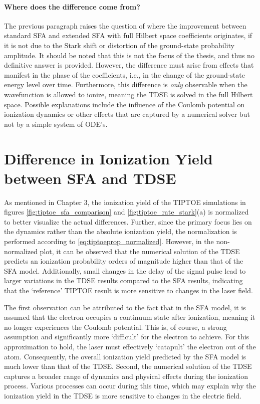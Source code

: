 \paragraph{Where does the difference come from?}
The previous paragraph raises the question of where the improvement between standard SFA and extended SFA with full Hilbert space coefficients originates, if it is not due to the Stark shift or distortion of the ground-state probability amplitude.
It should be noted that this is not the focus of the thesis, and thus no definitive answer is provided.
However, the difference must arise from effects that manifest in the phase of the coefficients, i.e., in the change of the ground-state energy level over time. Furthermore, this difference is \emph{only} observable when the wavefunction is allowed to ionize, meaning the TDSE is solved in the full Hilbert space.
Possible explanations include the influence of the Coulomb potential on ionization dynamics or other effects that are captured by a numerical solver but not by a simple system of ODE's.

\section{Difference in Ionization Yield between SFA and TDSE}
As mentioned in Chapter 3, the ionization yield of the TIPTOE simulations in figures \ref{fig:tiptoe_sfa_comparison} and \ref{fig:tiptoe_rate_stark}(a) is normalized to better visualize the actual differences.
Further, since the primary focus lies on the dynamics rather than the absolute ionization yield, the normalization is performed according to \eqref{eq:tiptoeprop_normalized}.
However, in the non-normalized plot, it can be observed that the numerical solution of the TDSE predicts an ionization probability orders of magnitude higher than that of the SFA model.
Additionally, small changes in the delay of the signal pulse lead to larger variations in the TDSE results compared to the SFA results, indicating that the `reference' TIPTOE result is more sensitive to changes in the laser field.

The first observation can be attributed to the fact that in the SFA model, it is assumed that the electron occupies a continuum state after ionization, meaning it no longer experiences the Coulomb potential.
This is, of course, a strong assumption and significantly more `difficult' for the electron to achieve.
For this approximation to hold, the laser must effectively `catapult' the electron out of the atom.
Consequently, the overall ionization yield predicted by the SFA model is much lower than that of the TDSE.
Second, the numerical solution of the TDSE captures a broader range of dynamics and physical effects during the ionization process.
Various processes can occur during this time, which may explain why the ionization yield in the TDSE is more sensitive to changes in the electric field.

